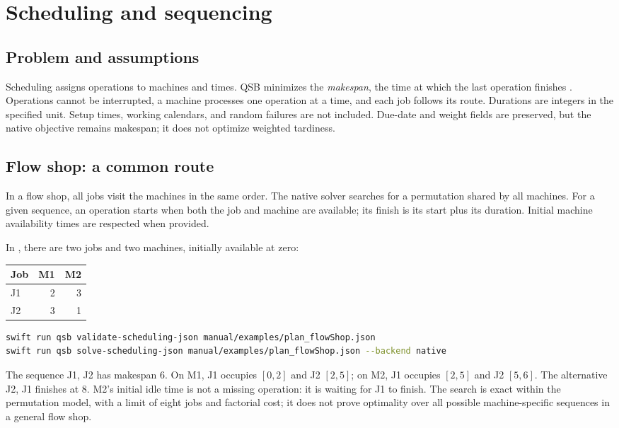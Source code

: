 \chapter{Scheduling and sequencing}
\label{chap:calendarizacion}

\section{Problem and assumptions}
Scheduling assigns operations to machines and times. QSB minimizes the
\emph{makespan}, the time at which the last operation finishes
\cite{pinedo2016scheduling}. Operations cannot be interrupted, a machine
processes one operation at a time, and each job follows its route. Durations
are integers in the specified unit. Setup times, working calendars, and
random failures are not included.
Due-date and weight fields are preserved, but the native objective remains
makespan; it does not optimize weighted tardiness.

\section{Flow shop: a common route}
In a flow shop, all jobs visit the machines in the same order.
The native solver searches for a permutation shared by all machines. For
a given sequence, an operation starts when both the job and machine are
available; its finish is its start plus its duration. Initial machine
availability times are respected when provided.

In , there are two jobs and two
machines, initially available at zero:
\begin{center}
\begin{tabular}{lrr}\toprule
Job & M1 & M2 \\
\midrule J1 & 2 & 3 \\ J2 & 3 & 1 \\
\bottomrule\end{tabular}
\end{center}
\begin{lstlisting}[language=bash]
swift run qsb validate-scheduling-json manual/examples/plan_flowShop.json
swift run qsb solve-scheduling-json manual/examples/plan_flowShop.json --backend native
\end{lstlisting}
The sequence J1, J2 has makespan 6. On M1, J1 occupies $[0,2]$ and J2 $[2,5]$;
on M2, J1 occupies $[2,5]$ and J2 $[5,6]$. The alternative J2, J1 finishes at 8.
M2's initial idle time is not a missing operation: it is waiting for J1 to
finish. The search is exact within the permutation model, with a limit of
eight jobs and factorial cost; it does not prove optimality over all possible
machine-specific sequences in a general flow shop.

